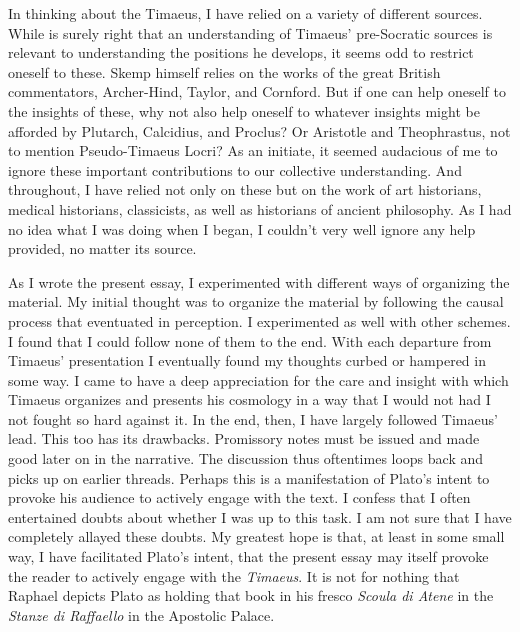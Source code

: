 In thinking about the Timaeus, I have relied on a variety of different sources. While \citet{Skemp:1942oc} is surely right that an understanding of Timaeus' pre-Socratic sources is relevant to understanding the positions he develops, it seems odd to restrict oneself to these. Skemp himself relies on the works of the great British commentators, Archer-Hind, Taylor, and Cornford. But if one can help oneself to the insights of these, why not also help oneself to whatever insights might be afforded by Plutarch, Calcidius, and Proclus? Or Aristotle and Theophrastus, not to mention Pseudo-Timaeus Locri? As an initiate, it seemed audacious of me to ignore these important contributions to our collective understanding. And throughout, I have relied not only on these but on the work of art historians, medical historians, classicists, as well as historians of ancient philosophy. As I had no idea what I was doing when I began, I couldn't very well ignore any help provided, no matter its source.

As I wrote the present essay, I experimented with different ways of organizing the material. My initial thought was to organize the material by following the causal process that eventuated in perception. I experimented as well with other schemes. I found that I could follow none of them to the end. With each departure from Timaeus' presentation I eventually found my thoughts curbed or hampered in some way. I came to have a deep appreciation for the care and insight with which Timaeus organizes and presents his cosmology in a way that I would not had I not fought so hard against it. In the end, then, I have largely followed Timaeus' lead. This too has its drawbacks. Promissory notes must be issued and made good later on in the narrative. The discussion thus oftentimes loops back and picks up on earlier threads. Perhaps this is a manifestation of Plato's intent to provoke his audience to actively engage with the text. I confess that I often entertained doubts about whether I was up to this task. I am not sure that I have completely allayed these doubts. My greatest hope is that, at least in some small way, I have facilitated Plato's intent, that the present essay may itself provoke the reader to actively engage with the \emph{Timaeus}. It is not for nothing that Raphael depicts Plato as holding that book in his fresco \emph{Scoula di Atene} in the \emph{Stanze di Raffaello} in the Apostolic Palace.

